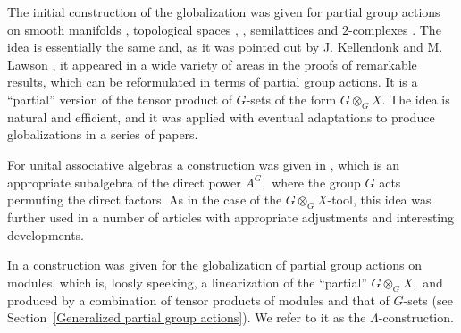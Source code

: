 \documentclass[11pt]{amsart}
\numberwithin{equation}{section}
\theoremstyle{definition}
\theoremstyle{remark}
\begin{document}
The initial construction of the globalization  was given for    partial group actions on smooth manifolds  \cite{Article_Palais_1957_AGFOTTOTG},   topological spaces  \cite{Article_Abadie_2003_EAADFPA}, \cite{Article_Kellendonk-Lawson_2004_PAOG}, semilattices \cite{Article_Kellendonk-Lawson_2004_PAOG} and $2$-complexes \cite{Article_Steinberg_2003_PAOGOCC}. The idea  is essentially the same and, as it was pointed out by J. Kellendonk and M. Lawson \cite{Article_Kellendonk-Lawson_2004_PAOG}, it  appeared in a wide variety of areas in the proofs of remarkable results, which can be reformulated in terms of partial group actions. It is a ``partial'' version of the tensor product of $G$-sets of the form $G\otimes _G X.$     The idea is  natural and efficient,  and it was applied with eventual adaptations to produce globalizations in a series of papers.   

For unital associative algebras a construction was given in \cite{Article_Dokuchaev-Exel_2005_AOCPBPAEAAPR}, which is an appropriate subalgebra of the direct power $A^G,$  where 
the group $G$ acts permuting the direct factors. As in the case of the $G\otimes _G X$-tool, this idea was further used in a number of articles with  appropriate adjustments and interesting developments. 

   In \cite{Article_Jerez_2024_OTHOPGA} a construction was given for the globalization of partial group actions on modules,
  which is, loosly speeking, a linearization of the ``partial''  $G\otimes _G X,$ and produced by  a combination of tensor products of modules and that of $G$-sets (see Section~\ref{Generalized partial group actions}). We refer to it as the $\Lambda $-construction. 
  
\end{document}
